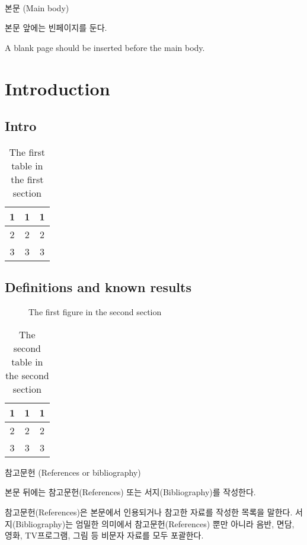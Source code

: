 \documentclass[11pt]{report}
\numberwithin{figure}{section}
\theoremstyle{plain}
\theoremstyle{definition}
\theoremstyle{corollary}
\theoremstyle{definition}
\theoremstyle{plain}
\theoremstyle{definition}
\theoremstyle{plain}
\begin{document}
\newpage 

\ %

\newpage
\begin{center}
\large
본문 (Main body)
\end{center}
\normalsize
본문 앞에는 빈페이지를 둔다.

A blank page should be inserted before the main body.


\chapter{Introduction} \label{chap:intro}
\section{Intro}
\lipsum

\begin{table}[h]
\begin{tabular}{ccc}
1&1&1\\\hline
2&2&2\\
3&3&3
\end{tabular}
\caption{The first table in the first section}
\end{table}

\section{Definitions and known results} \label{sec:def}
\lipsum

\begin{figure}[h]
\caption{The first figure in the second section}
\end{figure}

\begin{table}[h]
\begin{tabular}{ccc}
1&1&1\\\hline
2&2&2\\
3&3&3
\end{tabular}
\caption{The second table in the second section}
\end{table}


\newpage
\begin{center}
\large
참고문헌 (References or bibliography)
\end{center}
\normalsize
본문 뒤에는 참고문헌(References) 또는 서지(Bibliography)를 작성한다. 

참고문헌(References)은 본문에서 인용되거나 참고한 자료를 작성한 목록을 말한다.
서지(Bibliography)는 엄밀한 의미에서 참고문헌(References) 뿐만 아니라 음반, 면담, 영화, TV프로그램, 그림 등 비문자 자료를 모두 포괄한다.
 
\end{document}
